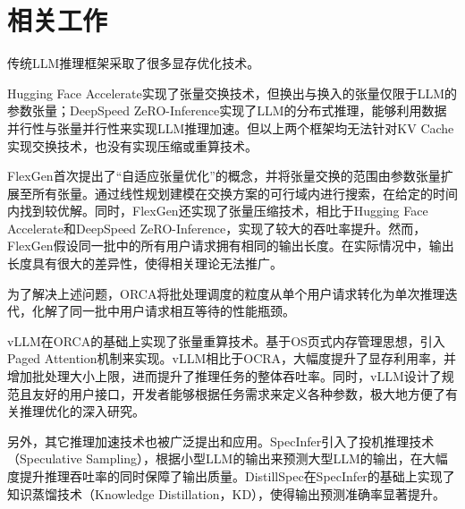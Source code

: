 \section{相关工作}

传统LLM推理框架采取了很多显存优化技术。 \par

Hugging Face Accelerate\cite{Huggingface-Accelerate}实现了张量交换技术，但换出与换入的张量仅限于LLM的参数张量；DeepSpeed ZeRO-Inference\cite{GPT-175B资源消耗}实现了LLM的分布式推理，能够利用数据并行性与张量并行性来实现LLM推理加速。但以上两个框架均无法针对KV Cache实现交换技术，也没有实现压缩或重算技术。 \par

FlexGen\cite{Swapping}首次提出了“自适应张量优化”的概念，并将张量交换的范围由参数张量扩展至所有张量。通过线性规划建模在交换方案的可行域内进行搜索，在给定的时间内找到较优解。同时，FlexGen还实现了张量压缩技术，相比于Hugging Face Accelerate和DeepSpeed ZeRO-Inference，实现了较大的吞吐率提升。然而，FlexGen假设同一批中的所有用户请求拥有相同的输出长度。在实际情况中，输出长度具有很大的差异性，使得相关理论无法推广。\par

为了解决上述问题，ORCA\cite{ORCA}将批处理调度的粒度从单个用户请求转化为单次推理迭代，化解了同一批中用户请求相互等待的性能瓶颈。 \par

vLLM\cite{vLLM}在ORCA的基础上实现了张量重算技术。基于OS页式内存管理思想，引入Paged Attention机制来实现。vLLM相比于OCRA，大幅度提升了显存利用率，并增加批处理大小上限，进而提升了推理任务的整体吞吐率。同时，vLLM设计了规范且友好的用户接口，开发者能够根据任务需求来定义各种参数，极大地方便了有关推理优化的深入研究。 \par

另外，其它推理加速技术也被广泛提出和应用。SpecInfer\cite{SpecInfer}引入了投机推理技术（Speculative Sampling），根据小型LLM的输出来预测大型LLM的输出，在大幅度提升推理吞吐率的同时保障了输出质量。DistillSpec\cite{DistillSpec}在SpecInfer的基础上实现了知识蒸馏技术（Knowledge Distillation，KD），使得输出预测准确率显著提升。